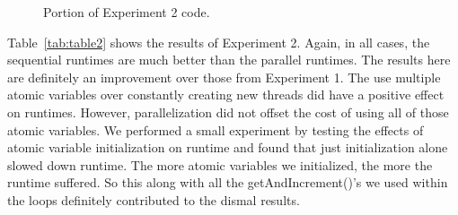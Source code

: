 \documentclass[conference]{IEEEtran}
\begin{document}
\begin{figure}[htbp]
\centerline{}
\caption{Portion of Experiment 2 code.}
\label{13}
\end{figure}

Table~\ref{tab:table2} shows the results of Experiment 2. Again, in all cases, the sequential runtimes are much better than the parallel runtimes. The results here are definitely an improvement over those from Experiment 1. The use multiple atomic variables over constantly creating new threads did have a positive effect on runtimes. However, parallelization did not offset the cost of using all of those atomic variables. We performed a small experiment by testing the effects of atomic variable initialization on runtime and found that just initialization alone slowed down runtime. The more atomic variables we initialized, the more the runtime suffered. So this along with all the getAndIncrement()'s we used within the loops definitely contributed to the dismal results.
\end{document}
